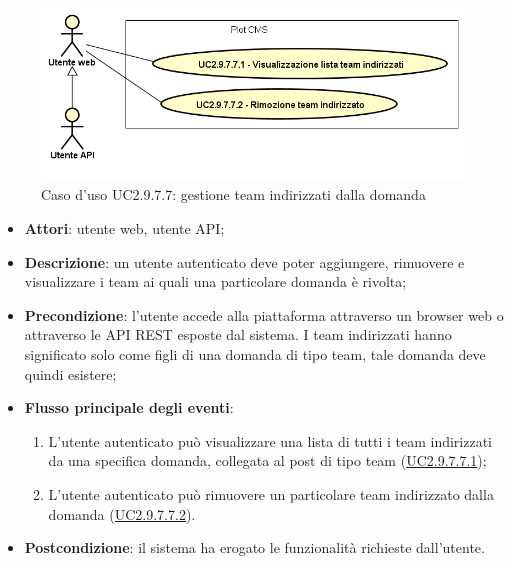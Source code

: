         \begin{figure}[H]
            \centering
            \includegraphics[scale=0.65, width=\textwidth]{immagini/usecase/UC2-9-7-7.png}
            \caption{Caso d'uso UC2.9.7.7: gestione team indirizzati dalla domanda}\label{fig:UC2.9.7.7} 
        \end{figure}
\begin{itemize}
\item \textbf{Attori}: utente web, utente API;
\item \textbf{Descrizione}: un utente autenticato deve poter aggiungere, rimuovere e visualizzare i team ai quali una particolare domanda è rivolta; 
      \item \textbf{Precondizione}: l'utente accede alla piattaforma attraverso un browser web o attraverso le API REST esposte dal sistema. I team indirizzati hanno significato solo come figli di una domanda di tipo team, tale domanda deve quindi esistere;

        \item \textbf{Flusso principale degli eventi}:
          \begin{enumerate}
          \item L'utente autenticato può visualizzare una lista di tutti i team indirizzati da una specifica domanda, collegata al post di tipo team (\hyperlink{UC2.9.7.7.1}{UC2.9.7.7.1});
          \item L'utente autenticato può rimuovere un particolare team indirizzato dalla domanda (\hyperlink{UC2.9.7.7.2}{UC2.9.7.7.2}).

      \end{enumerate}
    \item \textbf{Postcondizione}: il sistema ha erogato le funzionalità richieste dall'utente.
  \end{itemize}
\hypertarget{UC2.9.7.7.1}{}
